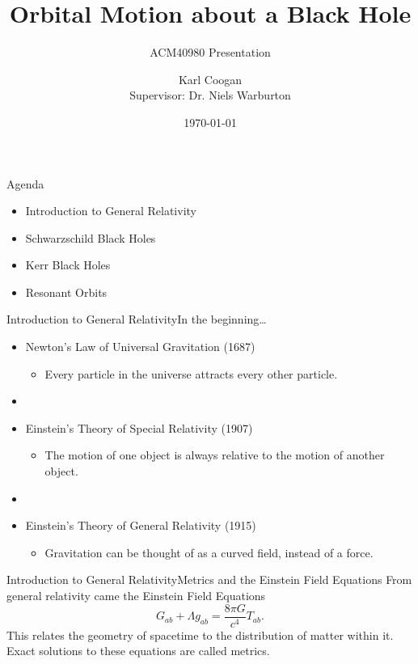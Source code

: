 \documentclass[12pt]{beamer}
\title{Orbital Motion about a Black Hole}
\subtitle{ACM40980 Presentation}
\author[Karl Coogan]{Karl Coogan\\[10mm]{Supervisor: Dr. Niels Warburton}}
\date{\today}
\begin{document}
\maketitle

\begin{frame}{Agenda}
\begin{itemize}
    \item Introduction to General Relativity
    \item Schwarzschild Black Holes
    \item Kerr Black Holes
    \item \alert<2>{Resonant Orbits}
\end{itemize}
\end{frame}

\begin{frame}{Introduction to General Relativity}{In the beginning\ldots}
\begin{itemize}
    \item[] Newton's Law of Universal Gravitation (1687)
    \begin{itemize}
        \item Every particle in the universe attracts every other particle.
    \end{itemize}
    \item[]
    \item[] Einstein's Theory of Special Relativity (1907)
    \begin{itemize}
        \item The motion of one object is always relative to the motion of another object.
    \end{itemize}
    \item[]
    \item[] Einstein's Theory of General Relativity (1915)
    \begin{itemize}
        \item Gravitation can be thought of as a curved field, instead of a force.
    \end{itemize}
\end{itemize}
\end{frame}

\begin{frame}{Introduction to General Relativity}{Metrics and the Einstein Field Equations}
From general relativity came the Einstein Field Equations
\begin{equation}
    G_{ab}+\Lambda g_{ab}=\frac{8\pi G}{c^4}T_{ab}.
\end{equation}
This relates the geometry of spacetime to the distribution of matter within it.\\
\vskip10pt
Exact solutions to these equations are called metrics.
\end{frame}
\end{document}
